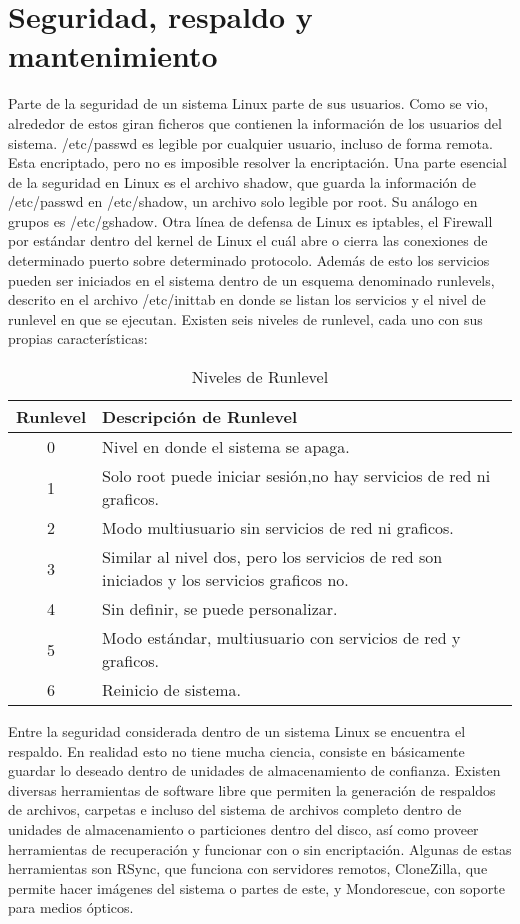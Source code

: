 \documentclass[11pt,letterpaper]{article} 	%
\begin{document}
\section*{Seguridad, respaldo y mantenimiento}
Parte de la seguridad de un sistema Linux parte de sus usuarios. Como se vio, alrededor de estos giran ficheros que contienen la información de los usuarios del sistema. /etc/passwd es legible por cualquier usuario, incluso de forma remota. Esta encriptado, pero no es imposible resolver la encriptación. Una parte esencial de la seguridad en Linux es el archivo shadow, que guarda la información de /etc/passwd en /etc/shadow, un archivo solo legible por root. Su análogo en grupos es /etc/gshadow. Otra línea de defensa de Linux es iptables, el Firewall por estándar dentro del kernel de Linux el cuál abre o cierra las conexiones de determinado puerto sobre determinado protocolo. Además de esto los servicios pueden ser iniciados en el sistema dentro de un esquema denominado runlevels, descrito en el archivo /etc/inittab en donde se listan los servicios y el nivel de runlevel en que se ejecutan. Existen seis niveles de runlevel, cada uno con sus propias características:
\begin{table}[H]
\caption{Niveles de Runlevel}
\begin{tabular}{|c|l|}
\hline
\textbf{Runlevel} & \textbf{Descripción de Runlevel} \\ \hline
0 & Nivel en donde el sistema se apaga. \\ \hline
1 & Solo root puede iniciar sesión,no hay servicios de red ni graficos. \\ \hline
2 & Modo multiusuario sin servicios de red ni graficos. \\ \hline
3 & Similar al nivel dos, pero los servicios de red son iniciados y los servicios graficos no. \\ \hline
4 & Sin definir, se puede personalizar. \\ \hline
5 & Modo estándar, multiusuario con servicios de red y graficos. \\ \hline
6 & Reinicio de sistema. \\ \hline
\end{tabular}
\label{}
\end{table}\par
Entre la seguridad considerada dentro de un sistema Linux se encuentra el respaldo. En realidad esto no tiene mucha ciencia, consiste en básicamente guardar lo deseado dentro de unidades de almacenamiento de confianza. Existen diversas herramientas de software libre que permiten la generación de respaldos de archivos, carpetas e incluso del sistema de archivos completo dentro de unidades de almacenamiento o particiones dentro del disco, así como proveer herramientas de recuperación y funcionar con o sin encriptación. Algunas de estas herramientas son RSync, que funciona con servidores remotos, CloneZilla, que permite hacer imágenes del sistema o partes de este, y Mondorescue, con soporte para medios ópticos.\par
\end{document}
